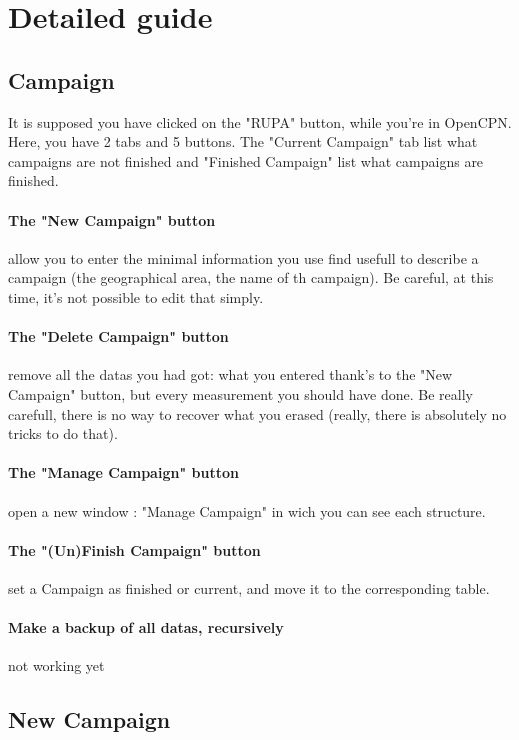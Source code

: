 \documentclass[11pt]{report}
\begin{document}
        \section{Detailed guide}
		\subsection{Campaign}
		    It is supposed you have clicked on the "RUPA" button, while you're in OpenCPN.
		    Here, you have 2 tabs and 5 buttons. The "Current Campaign" tab list what campaigns are not finished
		    and "Finished Campaign" list what campaigns are finished.
		    \paragraph{The "New Campaign" button} allow you to enter the minimal information you use find usefull to describe
		    a campaign (the geographical area, the name of th campaign). Be careful, at this time, it's not possible 
		    to edit that simply.
		    \paragraph{The "Delete Campaign" button} remove all the datas you had got: what you entered thank's to the "New 
		    Campaign" button, but every measurement you should have done. Be really carefull, there is no way to 
		    recover what you erased (really, there is absolutely no tricks to do that).
		    \paragraph{The "Manage Campaign" button} open a new window : "Manage Campaign" in wich you can see each structure.
		    \paragraph{The "(Un)Finish Campaign" button} set a Campaign as finished or current, and move it to the corresponding table.
            \paragraph{Make a backup of all datas, recursively} not working yet

        \vspace{1cm}
		\subsection{New Campaign}
\end{document}
